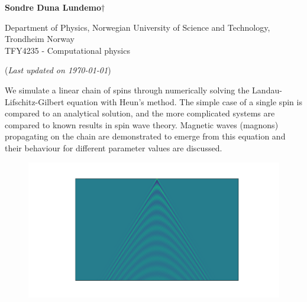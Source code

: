 


	
\begin{titlepage}
	\begin{center}
	\setlength{\parskip}{0em}
	\thispagestyle{titlepage}
	

	\vspace{4mm}
	
	\large{\textbf{Sondre Duna Lundemo}}$\dagger$
	
	\normalsize{Department of Physics, Norwegian University of Science and Technology, Trondheim Norway \\
	TFY4235 - Computational physics
	}

	(\textit{Last updated on \today})
	\end{center}

	\setlength{\parindent}{2em}
	
		We simulate a linear chain of spins through numerically solving the Landau-Lifschitz-Gilbert equation with Heun's method. The simple case of a single spin is compared to an analytical solution, and the more complicated systems are compared to known results in spin wave theory. Magnetic waves (magnons) propagating on the chain are demonstrated to emerge from this equation and their behaviour for different parameter values are discussed.
	
	\begin{figure}[htb]
		\centering
		\includegraphics[width=\columnwidth]{../fig/front_fig.pdf}
	\end{figure}
	

\end{titlepage}

\newpage
\setlength{\parskip}{0em}
\tableofcontents
\setlength{\parskip}{1em}
\newpage


